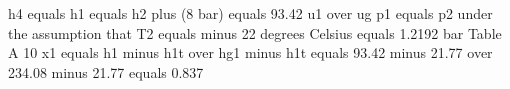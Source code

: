 h4 equals h1 equals h2 plus (8 bar) equals 93.42 u1 over ug  
p1 equals p2 under the assumption that T2 equals minus 22 degrees Celsius  
equals 1.2192 bar  
Table A 10  
x1 equals h1 minus h1t over hg1 minus h1t equals 93.42 minus 21.77 over 234.08 minus 21.77  
equals 0.837